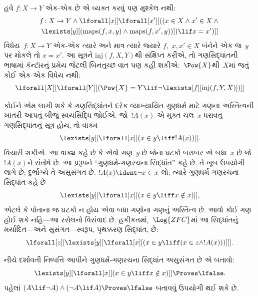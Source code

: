 હવે $f\colon X\to Y$ એક-એક છે એ વ્યક્ત કરવું પણ મુશ્કેલ નથી:
\begin{multline*}
 f \colon X \to Y \land \lforall[x][\lforall[x'][((x \in X \land x' \in
     X \land {} \\
 \lexists[y][(\mathrm{maps}(f, x, y) \land \mathrm{maps}(f,
        x', y))]) \lif x = x')]]
\end{multline*}
વિધેય~$f\colon X\to Y$ એક-એક ત્યારે અને માત્ર ત્યારે જ્યારે
$f$,~$x,x'\in X$ બંનેને એક જ~$y$ પર મોકલે તો $x=x'$. આ સૂત્રને
$\mathrm{inj}(f,X,Y)$થી સંક્ષિપ્ત કરીએ, તો ગણસિદ્ધાંતની ભાષામાં
કૅન્ટૉરનું પ્રમેય જેટલી બિનતુચ્છ વાત પણ કહી શકીએ:~$\Pow{X}$થી~$X$માં
જતું કોઈ એક-એક વિધેય નથી:
\[
\lforall[X][\lforall[Y][(\Pow{X} = Y \lif
    \lnot\lexists[f][\mathrm{inj}(f, Y, X)])]]
\]

કોઈને એમ લાગી શકે કે ગણસિદ્ધાંતને દરેક વ્યાખ્યાયિત ગુણધર્મ માટે ગણના
અસ્તિત્વની ખાતરી આપતું બીજું સ્વયંસિદ્ધિ જોઈએ. જો~$!A(x)$ એ મુક્ત
ચલ~$x$ ધરાવતું ગણસિદ્ધાંતનું સૂત્ર હોય, તો વાક્ય
\[
\lexists[y][\lforall[x][(x \in y \liff !A(x))]].
\]
વિચારી શકીએ. આ વાક્ય કહે છે કે એવો ગણ~$y$ છે જેના ઘટકો
બરાબર એ બધા~$x$ છે જે~$!A(x)$ને સંતોષે છે. આ પ્રરૂપને
``ગુણધર્મ-ગણરચના સિદ્ધાંત'' કહે છે. તે ખૂબ ઉપયોગી લાગે છે; દુર્ભાગ્યે
તે અસુસંગત છે. $!A(x)\ident\lnot x\in x$ લો; ત્યારે
ગુણધર્મ-ગણરચના સિદ્ધાંત કહે છે
\[
\lexists[y][\lforall[x][(x \in y \liff x \notin x)]],
\]
એટલે કે પોતાના જ ઘટકો ન હોય એવા બધા ગણોના ગણનું અસ્તિત્વ છે.
આવો કોઈ ગણ હોઈ શકે નહિ---આ રસેલનો વિસંવાદ છે. હકીકતમાં,~$\Log{ZFC}$માં
આ સિદ્ધાંતનું મર્યાદિત---અને સુસંગત---સ્વરૂપ, પૃથક્કરણ સિદ્ધાંત, છે:
\[
\lforall[z][\lexists[y][\lforall[x][(x \in y \liff (x \in z \land
      !A(x)))]]].
\]

\begin{prob}
નીચે દર્શાવતી નિષ્પત્તિ આપીને ગુણધર્મ-ગણરચના સિદ્ધાંત અસુસંગત
છે એ બતાવો:
\[
\lexists[y][\lforall[x][(x \in y \liff x \notin x)]] \Proves \lfalse.
\]
પહેલાં $(A\lif\lnot A)\land(\lnot A\lif A)\Proves\lfalse$ બતાવવું
ઉપયોગી થઈ શકે છે.
\end{prob}
\endgroup



